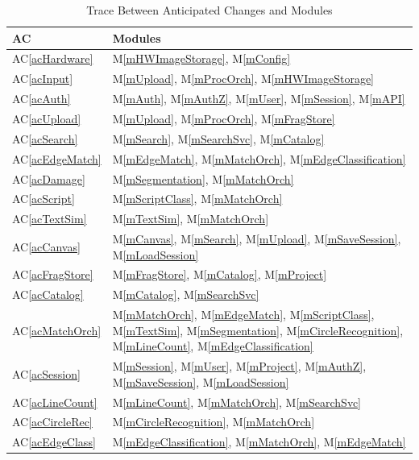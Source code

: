 \documentclass[12pt, titlepage]{article}
\newcommand{\acref}[1]{AC\ref{#1}}
\newcommand{\mref}[1]{M\ref{#1}}
\begin{document}
\begin{table}[H]
\centering
\begin{tabular}{p{} p{}}
\toprule
\textbf{AC} & \textbf{Modules}\\
\midrule
\acref{acHardware} & \mref{mHWImageStorage}, \mref{mConfig}\\
\acref{acInput} & \mref{mUpload}, \mref{mProcOrch}, \mref{mHWImageStorage}\\
\acref{acAuth} & \mref{mAuth}, \mref{mAuthZ}, \mref{mUser}, \mref{mSession}, \mref{mAPI}\\
\acref{acUpload} & \mref{mUpload}, \mref{mProcOrch}, \mref{mFragStore}\\
\acref{acSearch} & \mref{mSearch}, \mref{mSearchSvc}, \mref{mCatalog}\\
\acref{acEdgeMatch} & \mref{mEdgeMatch}, \mref{mMatchOrch}, \mref{mEdgeClassification}\\
\acref{acDamage} & \mref{mSegmentation}, \mref{mMatchOrch}\\
\acref{acScript} & \mref{mScriptClass}, \mref{mMatchOrch}\\
\acref{acTextSim} & \mref{mTextSim}, \mref{mMatchOrch}\\
\acref{acCanvas} & \mref{mCanvas}, \mref{mSearch}, \mref{mUpload}, \mref{mSaveSession}, \mref{mLoadSession}\\
\acref{acFragStore} & \mref{mFragStore}, \mref{mCatalog}, \mref{mProject}\\
\acref{acCatalog} & \mref{mCatalog}, \mref{mSearchSvc}\\
\acref{acMatchOrch} & \mref{mMatchOrch}, \mref{mEdgeMatch}, \mref{mScriptClass}, \mref{mTextSim}, \mref{mSegmentation}, \mref{mCircleRecognition}, \mref{mLineCount}, \mref{mEdgeClassification}\\
\acref{acSession} & \mref{mSession}, \mref{mUser}, \mref{mProject}, \mref{mAuthZ}, \mref{mSaveSession}, \mref{mLoadSession}\\
\acref{acLineCount} & \mref{mLineCount}, \mref{mMatchOrch}, \mref{mSearchSvc}\\
\acref{acCircleRec} & \mref{mCircleRecognition}, \mref{mMatchOrch}\\
\acref{acEdgeClass} & \mref{mEdgeClassification}, \mref{mMatchOrch}, \mref{mEdgeMatch}\\
\bottomrule
\end{tabular}
\caption{Trace Between Anticipated Changes and Modules}
\label{TblACT}
\end{table}
\end{document}
